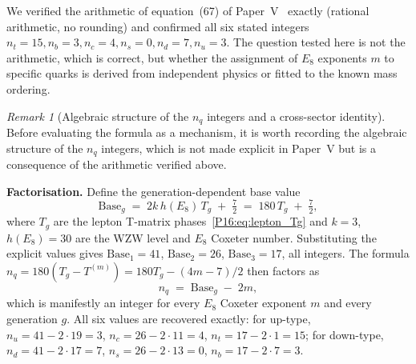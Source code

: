 \documentclass[11pt,a4paper]{article}
\theoremstyle{definition}\newtheorem{definition}[theorem]{Definition}
\theoremstyle{remark}
\newtheorem{remark}[theorem]{Remark}
\theoremstyle{definition}\newtheorem{construction}[theorem]{Construction}
\begin{document}
We verified the arithmetic of equation~(67) of Paper~V~\cite{Paper5} exactly
(rational arithmetic, no rounding) and confirmed all six stated
integers $n_t=15,n_b=3,n_c=4,n_s=0,n_d=7,n_u=3$. The question tested
here is not the arithmetic, which is correct, but whether the
assignment of $E_8$ exponents $m$ to specific quarks is derived from
independent physics or fitted to the known mass ordering.

\begin{remark}[Algebraic structure of the $n_q$ integers and a cross-sector identity]
\label{P16:rem:nq_structure}
Before evaluating the formula as a mechanism, it is worth recording
the algebraic structure of the $n_q$ integers, which is not made
explicit in Paper~V but is a consequence of the arithmetic verified
above.

\textbf{Factorisation.}
Define the generation-dependent base value
\begin{equation}
  \mathrm{Base}_g \;=\; 2k\,h(E_8)\,T_g \;+\; \tfrac{7}{2}
  \;=\; 180\,T_g \;+\; \tfrac{7}{2},
  \label{P16:eq:nq_base}
\end{equation}
where $T_g$ are the lepton T-matrix phases~\eqref{P16:eq:lepton_Tg} and
$k=3$, $h(E_8)=30$ are the WZW level and $E_8$ Coxeter number.
Substituting the explicit values gives $\mathrm{Base}_1=41$,
$\mathrm{Base}_2=26$, $\mathrm{Base}_3=17$, all integers.
The formula $n_q = 180(T_g - T^{(m)}) = 180T_g - (4m-7)/2$ then
factors as
\begin{equation}
  n_q \;=\; \mathrm{Base}_g \;-\; 2m,
  \label{P16:eq:nq_factored}
\end{equation}
which is manifestly an integer for every $E_8$ Coxeter exponent $m$
and every generation $g$.  All six values are recovered exactly: for
up-type, $n_u = 41 - 2\cdot19 = 3$, $n_c = 26 - 2\cdot11 = 4$,
$n_t = 17 - 2\cdot1 = 15$; for down-type, $n_d = 41 - 2\cdot17 = 7$,
$n_s = 26 - 2\cdot13 = 0$, $n_b = 17 - 2\cdot7 = 3$.


\end{remark}
\end{document}

